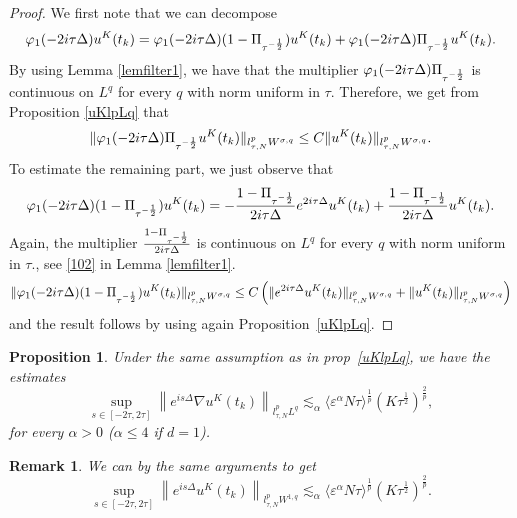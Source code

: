 \documentclass[10pt,a4paper]{article}
\newtheorem{proposition}[theorem]{Proposition}
\newtheorem{remark}[theorem]{Remark}
\begin{document}
  \begin{proof}
    We first note that we can decompose
    \[
      \varphi_1(-2i\tau\Delta) u^K(t_k) = \varphi_1(-2i\tau\Delta) (1 - \Pi_{\tau^{-{1 \over 2}}})u^K(t_k) + \varphi_1(-2i\tau\Delta)  \Pi_{\tau^{-{1 \over 2}}}u^K(t_k).
    \]
    By using Lemma \ref{lemfilter1}, we have that  the multiplier $ \varphi_{1}(-2i \tau \Delta)  \Pi_{\tau^{-{1 \over 2}}} $ is continuous on $L^q$ for every $q$ with norm uniform in $\tau$. 
    Therefore, we get from Proposition \ref{uKlpLq} that
    $$
    \| \varphi_{1}(-2i \tau \Delta) { \Pi_{\tau^{-{1 \over 2}}}} u^K(t_{k})\|_{l^p_{\tau, N}W^{\sigma, q}} \leq C \|u^K(t_{k})\|_{l^p_{\tau, N}W^{\sigma, q}}.
    $$
    To estimate the remaining part, we just observe that
    $$
    \varphi_{1}(-2i \tau \Delta) ( 1 - \Pi_{\tau^{-{1 \over 2}}})u^K(t_{k}) =- {1 - \Pi_{\tau^{-{1 \over 2}}} \over 2 i \tau \Delta }   e^{2 i\tau \Delta} u^K(t_{k})  + {1 - \Pi_{\tau^{-{1 \over 2}}} \over 2 i \tau \Delta } u^K(t_{k}).
    $$
    Again, the multiplier  ${1 - \Pi_{\tau^{-{1 \over 2}}} \over 2 i \tau \Delta } $ is continuous on $L^q$ for every $q$ with norm uniform in $\tau.$, see \eqref{102} in Lemma \ref{lemfilter1}.
    $$
    \|\varphi_{1}(-2i \tau \Delta) ( 1 - \Pi_{\tau^{-{1 \over 2}}})u^K(t_{k})\|_{l^p_{\tau, N}W^{\sigma, q}}\leq C\left(  \|e^{2 i\tau \Delta} u^K(t_{k})\|_{l^p_{\tau, N}W^{\sigma, q}} + \|u^K(t_{k})\|_{l^p_{\tau, N}W^{\sigma, q}}   \right)
    $$
    and the result follows by using again Proposition~\ref{uKlpLq}.
  \end{proof}

  \begin{proposition}\label{DuKlpLq}
    Under the same assumption as in prop~\ref{uKlpLq}, we have the estimates
    \begin{equation}
       \sup_{s\in[-2\tau,2\tau]} \left\|e^{is\Delta}\nabla u^K(t_k)\right\|_{l^p_{\tau,N}L^q}
       \lesssim_\alpha \langle\varepsilon^\alpha N\tau\rangle^\frac1p (K\tau^\frac12)^\frac2p,
    \end{equation}
    for every \(\alpha>0\) (\(\alpha\leq4\) if \(d=1\)).
  \end{proposition}
  \begin{remark}
    We can by the same arguments to get 
    \begin{equation}
      \sup_{s\in[-2\tau,2\tau]} \left\|e^{is\Delta}u^K(t_k)\right\|_{l^p_{\tau,N}W^{1,q}}
      \lesssim_\alpha \langle\varepsilon^\alpha N\tau\rangle^\frac1p (K\tau^\frac12)^\frac2p.
    \end{equation}
  \end{remark}
\end{document}
